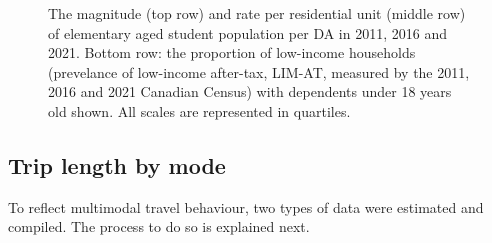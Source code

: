 \documentclass[
default
]{sn-jnl}
\begin{document}
\begin{figure}[H]


\caption{\label{fig-Fig3}The magnitude (top row) and rate per
residential unit (middle row) of elementary aged student population per
DA in 2011, 2016 and 2021. Bottom row: the proportion of low-income
households (prevelance of low-income after-tax, LIM-AT, measured by the
2011, 2016 and 2021 Canadian Census) with dependents under 18 years old
shown. All scales are represented in quartiles.}

\end{figure}%

\subsection{Trip length by mode}\label{trip-length-by-mode}

To reflect multimodal travel behaviour, two types of data were estimated
and compiled. The process to do so is explained next.
\end{document}
